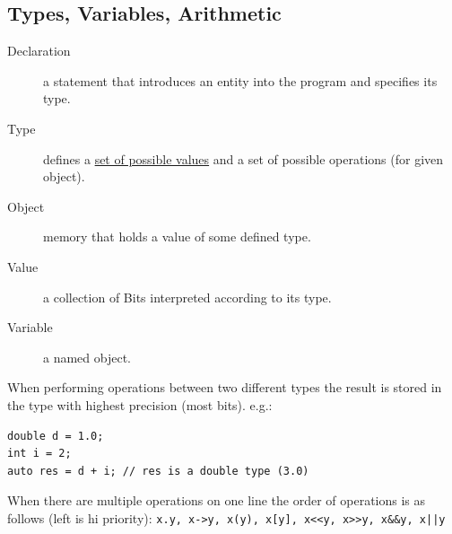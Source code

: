 \documentclass[a4paper, 10pt]{article}
\begin{document}
\subsection{Types, Variables, Arithmetic}
\begin{description}
	\item[Declaration]
	      a statement that introduces an entity into the program and specifies its type.
\end{description}
\begin{description}
	\item[Type]
	      defines a \href{https://en.cppreference.com/w/cpp/language/types}{set of possible values} and a set of possible operations (for given object).
\end{description}
\begin{description}
	\item[Object]
	      memory that holds a value of some defined type.
\end{description}
\begin{description}
	\item[Value]
	      a collection of Bits interpreted according to its type.
\end{description}
\begin{description}
	\item[Variable]
	      a named object.
\end{description}
When performing operations between two different types the result is stored in the type with highest precision (most bits).
e.g.:
\begin{lstlisting}[style=cpp]
double d = 1.0;
int i = 2;
auto res = d + i; // res is a double type (3.0)
\end{lstlisting}
When there are multiple operations on one line the order of operations is as follows (left is hi priority):\newline
\verb!x.y, x->y, x(y), x[y], x<<y, x>>y, x&&y, x||y!
\end{document}
